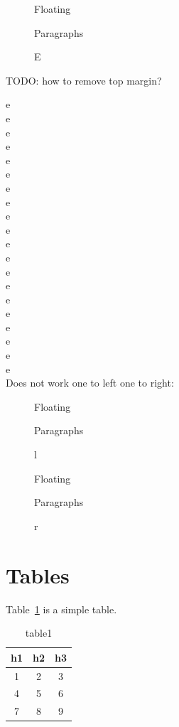 \documentclass[12pt]{article}
\begin{document}
\begin{figure}
\begin{flushleft}
Floating

Paragraphs

E
\end{flushleft}
\end{figure}

TODO: how to remove top margin?

e \\ e \\ e \\ e\\ e \\ e \\ e \\ e \\ e\\ e \\
e \\ e \\ e \\ e\\ e \\ e \\ e \\ e \\ e\\ e \\

Does not work one to left one to right:

\begin{figure}
Floating

Paragraphs

l
\end{figure}

\begin{figure}
Floating

Paragraphs

r
\end{figure}

\clearpage

\section{Tables}\label{table}

Table~\ref{table1} is a simple table.

\begin{table}
\begin{tabular}{ccc}
h1 & h2 & h3 \\
\hline
1 & 2 & 3 \\
4 & 5 & 6 \\
7 & 8 & 9 \\
\end{tabular}
\caption{table1}
\label{table1}
\end{table}
\end{document}
